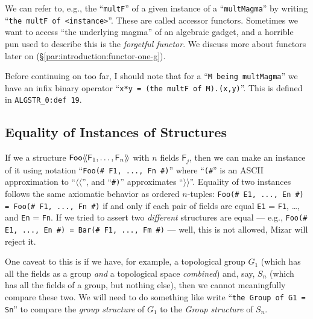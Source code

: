 {\begin{notation}
We can refer to, e.g., the ``\verb#multF#'' of a given instance of a
``\verb#multMagma#'' by writing
``\verb#the multF of <instance>#''. These are called accessor
functors. Sometimes we want to access ``the underlying magma'' of an
algebraic gadget, and a horrible pun used to describe this is the
\emph{forgetful functor}. We discuss more about
functors later on (\S\ref{par:introduction:functor-one-g}).
\end{notation}

\begin{aside}\label{rmk:introduction:multiplication-operator}
Before continuing on too far, I should note that for a
``\texttt{M being multMagma}'' we have an infix binary operator
``\texttt{x*y = (the multF of M).(x,y)}''. This is defined in
\verb#ALGSTR_0:def 19#.
\end{aside}

\subsection{Equality of Instances of Structures}
If we a structure $\struct[Foo]{\mathsf{F}_{1},\dots,\mathsf{F}_{n}}$
with $n$ fields $\mathsf{F}_{j}$, then we can make an instance of it
using notation ``\verb$Foo(# F1, ..., Fn #)$'' where ``\verb$(#$'' is an
ASCII approximation to ``$\langle\!\langle$'', and ``\verb$#)$'' approximates
``$\rangle\!\rangle$''. Equality of two
instances follows the same axiomatic behavior as ordered $n$-tuples:
\verb$Foo(# E1, ..., En #) = Foo(# F1, ..., Fn #)$ if and only if each
pair of fields are equal
\verb#E1# = \verb#F1#, \dots, and \verb#En# = \verb#Fn#. If we tried
to assert two \emph{different} structures are equal --- e.g.,
\verb$Foo(# E1, ..., En #) = Bar(# F1, ..., Fm #)$ --- well, this is not
allowed, Mizar will reject it.

One caveat to this is if we have, for example, a topological group
$G_{1}$ (which has all the fields as a group \emph{and} a topological
space \emph{combined}) and, say, $S_{n}$ (which has all the fields of a
group, but nothing else), then we cannot meaningfully compare these
two. We will need to do something like write ``\verb#the Group of G1 = Sn#''
to compare the \emph{group structure} of $G_{1}$ to the \emph{Group structure}
of $S_{n}$.

}
